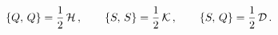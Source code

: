 \begin{equation}\label{boro3.2}
\{Q,\,Q\}=\frac{1}{2}\,{\cal H}\,,\qquad\{S,\,S\}=\frac{1}{2}\,{\cal K}\,,
\qquad\{S,\,Q\}=\frac{1}{2}\,{\cal D}\,.
\end{equation}

